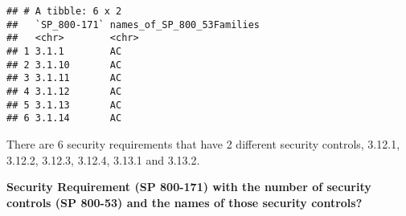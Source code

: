 \documentclass[]{article}
\newenvironment{Shaded}{\begin{snugshade}}{\end{snugshade}}
\newcommand{\KeywordTok}[1]{\textcolor[rgb]{0.13,0.29,0.53}{\textbf{#1}}}
\newcommand{\DataTypeTok}[1]{\textcolor[rgb]{0.13,0.29,0.53}{#1}}
\newcommand{\DecValTok}[1]{\textcolor[rgb]{0.00,0.00,0.81}{#1}}
\newcommand{\StringTok}[1]{\textcolor[rgb]{0.31,0.60,0.02}{#1}}
\newcommand{\OperatorTok}[1]{\textcolor[rgb]{0.81,0.36,0.00}{\textbf{#1}}}
\newcommand{\NormalTok}[1]{#1}
\begin{document}
\begin{Shaded}
\end{Shaded}

\begin{verbatim}
## # A tibble: 6 x 2
##   `SP_800-171` names_of_SP_800_53Families
##   <chr>        <chr>                     
## 1 3.1.1        AC                        
## 2 3.1.10       AC                        
## 3 3.1.11       AC                        
## 4 3.1.12       AC                        
## 5 3.1.13       AC                        
## 6 3.1.14       AC
\end{verbatim}

There are 6 security requirements that have 2 different security
controls, 3.12.1, 3.12.2, 3.12.3, 3.12.4, 3.13.1 and 3.13.2.

\textbf{Security Requirement (SP 800-171) with the number of security
controls (SP 800-53) and the names of those security controls?}

\begin{Shaded}
\end{Shaded}
\end{document}
